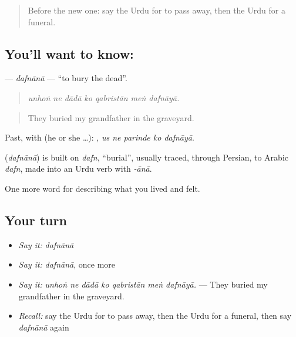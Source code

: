 \begin{quote}
Before the new one: say the Urdu for to pass away, then the Urdu for a funeral.
\end{quote}

\subsection*{You'll want to know: }
\textbf{} — \emph{dafnānā} — \textquotedblleft{}to bury the dead\textquotedblright{}.

\begin{quote}
      
\end{quote}

\begin{quote}
\emph{unhoṅ ne dādā ko qabristān meṅ dafnāyā.}
\end{quote}

\begin{quote}
They buried my grandfather in the graveyard.
\end{quote}

Past, with  (he or she …):     , \emph{us ne parinde ko dafnāyā}.

\begin{cousinweb}
\textbf{} (\emph{dafnānā}) is built on \emph{dafn}, \textquotedblleft{}burial\textquotedblright{}, usually traced, through Persian, to Arabic \emph{dafn}, made into an Urdu verb with \emph{-ānā}.
\end{cousinweb}

\begin{grammarlens}[title={What you've built}]
One more word for describing what you lived and felt.
\end{grammarlens}

\subsection*{Your turn}
\begin{itemize}
\raggedright
  \item \emph{Say it:} \emph{dafnānā}
  \item \emph{Say it:} \emph{dafnānā}, once more
  \item \emph{Say it:} \emph{unhoṅ ne dādā ko qabristān meṅ dafnāyā.} — They buried my grandfather in the graveyard.
  \item \emph{Recall:} say the Urdu for to pass away, then the Urdu for a funeral, then say \emph{dafnānā} again
\end{itemize}

